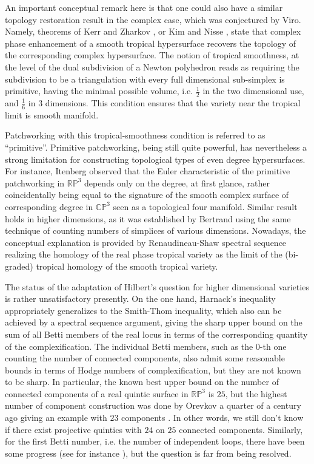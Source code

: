\documentclass[pdflatex,sn-mathphys-num]{sn-jnl}%
\theoremstyle{thmstyleone}%
\theoremstyle{thmstyletwo}%
\theoremstyle{thmstylethree}%
\newcommand{\RP}{\mathbb{R}\mathbb{P}}
\newcommand{\C}{\mathbb{C}}
\newcommand{\p}{{\mathbb{P}}}
\begin{document}
An important conceptual remark here is that one could also have a similar
topology restoration result in the complex case, which was conjectured by Viro. Namely, theorems of Kerr and Zharkov \cite{KerrZharkov18}, or Kim and Nisse \cite{KimNisse21}, state that complex phase enhancement of a smooth tropical hypersurface recovers the topology of the corresponding complex hypersurface. The notion of tropical smoothness, at the level of the dual subdivision of a Newton polyhedron reads as requiring the subdivision to be a triangulation with every full dimensional sub-simplex is primitive, having the minimal possible volume, i.e. $\frac{1}{2}$ in the two dimensional use, and $\frac{1}{6}$ in 3 dimensions. This condition ensures that the variety near the tropical limit is smooth manifold.

Patchworking with this tropical-smoothness condition is referred to as ``primitive''. Primitive patchworking, being still quite powerful, has nevertheless a strong limitation for constructing topological types of even degree hypersurfaces. For instance, Itenberg \cite{Itenberg97} observed that the Euler characteristic of the primitive patchworking in $\RP^3$ depends only on the degree, at first glance, rather coincidentally being equal to the signature of the smooth complex surface of corresponding degree in $\C\p^3$ seen as a topological four manifold. Similar result holds in higher dimensions, as it was established by Bertrand \cite{Bertrand10} using the same technique of counting numbers of simplices of various dimensions. Nowadays, the conceptual explanation is provided by Renaudineau-Shaw spectral sequence \cite{RenaudineauShaw23} realizing the homology of the real phase tropical variety as the limit of the (bi-graded) tropical homology \cite{IKMZ19} of the smooth tropical variety.

The status of the adaptation of Hilbert's question for higher dimensional varieties is rather unsatisfactory presently. On the one hand, Harnack's inequality appropriately generalizes to the Smith-Thom inequality, which  also can be achieved by a spectral sequence argument, giving the sharp upper bound on the sum of all Betti members of the real locus in terms of the corresponding quantity of the complexification. The individual Betti members, such as the $0$-th one counting the number of connected components, also admit some reasonable bounds in terms of Hodge numbers of complexification, but they are not known to be sharp. In particular, the known best upper bound on the number of connected components of a real quintic surface in $\RP^3$ is $25$, but the highest number of component construction was done by Orevkov a quarter of a century ago giving an example with $23$ components \cite{Orevkov01}. In other words, we still don't know if there exist projective quintics with $24$ on $25$ connected components. Similarly, for the first Betti number, i.e. the number of independent loops, there have been some progress (see for instance \cite{Renaudineau15}), but the question is far from being resolved.
\end{document}
